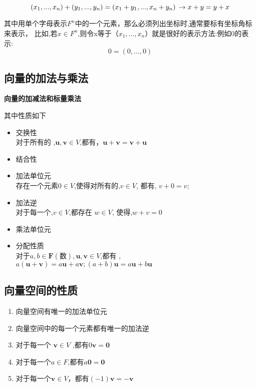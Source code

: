 \begin{equation}
    \left ( x_{1},...,x_{n} \right )+\left (y_{1},...,y_{n}  \right )=\left ( x_{1}+y_{1},...,x_{n}+y_{n} \right )\\
    \to x+y=y+x
\end{equation}
\newline
\par 其中用单个字母表示$F^n$中的一个元素，那么必须列出坐标时,通常要标有坐标角标来表示，
比如,若$x\in F^n$,则令x等于$（x_{1},…,x_{n}）$就是很好的表示方法:例如0的表示:\\
\begin{equation}
    0=\left ( 0,...,0 \right )
\end{equation}

\newpage

\subsection{向量的加法与乘法}
{\bfseries 向量的加减法和标量乘法\\}


其中性质如下
\begin{itemize}
    \item 交换性\\
对于所有的 ,$\textbf{u},\textbf{v}\in V $,都有，$\textbf{u}+\textbf{v}=\textbf{v}+\textbf{u}$
    \item 结合性
    \item 加法单位元\\
存在一个元素$ 0\in V$,使得对所有的,$v\in V$, 都有, $v+0=v$;
    \item 加法逆\\
对于每一个,$v\in V$,都存在 $w\in V$, 使得,$w+v=0$
    \item 乘法单位元
    \item 分配性质\\
对于$a,b \in \textbf{F}(数),\textbf{u},\textbf{v} \in V$,都有 ,$a(\textbf{u}+\textbf{v})=a\textbf{u}+a\textbf{v};(a+b)\textbf{u}=a\textbf{u}+b\textbf{u}$
\end{itemize}

\subsection{向量空间的性质}
\begin{enumerate}
    \item 向量空间有唯一的加法单位元
    \item 向量空间中的每一个元素都有唯一的加法逆
    \item 对于每一个 $\textbf{v}\in V$ ,都有$0\textbf{v}=\textbf{0}$
    \item 对于每一个$a\in F$,都有$a\textbf{0}=\textbf{0}$
    \item 对于每一个$\textbf{v}\in V$，都有$(-1)\textbf{v}=-\textbf{v}$
\end{enumerate}


